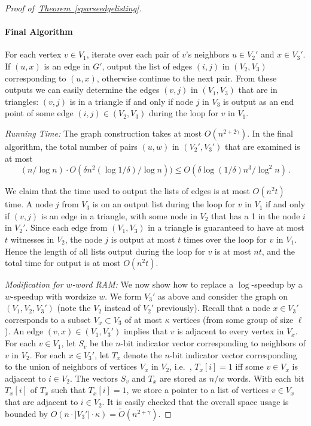 \documentclass[10pt]{article}
\theoremstyle{definition}
\providecommand{\ie}{i.e.\ }
\numberwithin{equation}{section}
\newcommand{\expref}[2]{\texorpdfstring{\hyperref[#2]{#1~\ref{#2}}}{#1~\ref{#2}}}
\begin{document}
\begin{proof}[Proof of~\expref{Theorem}{sparseedgelisting}]
\paragraph{Final Algorithm} For each vertex $v \in V_1$, iterate over each pair of $v$'s neighbors $u \in V_2'$ and $x \in V_3'$. If $(u,x)$ is an edge in $G'$, output the list of edges  $(i,j)$ in $(V_2,V_3)$ corresponding to $(u,x)$, otherwise continue to the next pair. From these outputs we can easily determine the edges $(v,j)$ in $(V_1,V_3)$
that are in triangles: $(v,j)$ is in a triangle if and only if node $j$ in $V_3$ is output as an end point of some edge $(i,j) \in (V_2,V_3)$ during the loop for $v$ in $V_1$.

\smallskip
\noindent
\emph{Running Time:} The graph construction takes at most $O(n^{2+2\gamma})$. In the final algorithm, the total number of pairs $(u,w)$ in $(V_2',V_3')$ that are examined is at most \[(n/\log n) \cdot O(\delta n^2 (\log 1/\delta)/ \log n)) \leq O(\delta \log (1/\delta) n^3/\log^2 n)\,.\]

We claim that the time used to output the lists of edges is at most $O(n^2 t)$ time. A node $j$ from $V_3$ is on an output list during the loop for $v$ in $V_1$ if and only if $(v,j)$ is an edge in a triangle, with some node in $V_2$ that has a 1 in the node $i$ in $V_2'$. Since each edge from $(V_1,V_3)$ in a triangle is guaranteed to have at most $t$ witnesses in $V_2$, the node $j$ is output at most $t$ times over the loop for $v$ in $V_1$. Hence the length of all lists output during the loop for $v$ is at most $nt$, and the total time for output is at most $O(n^2 t)$.

\smallskip
\noindent
\emph{Modification for $w$-word RAM:} We now show how to replace a $\log$-speedup by a $w$-speedup with wordsize $w$.
We form $V_3'$ as above and consider the graph on $(V_1,V_2,V_3')$ (note the $V_2$ instead of $V_2'$ previously).
Recall that a node $x \in V_3'$ corresponds to a subset $V_x \subset V_3$ of at most $\kappa$ vertices (from some group of size $\ell$).
An edge $(v,x) \in (V_1,V_3')$ implies that $v$ is adjacent to every vertex in $V_x$.
For each $v \in V_1$, let $S_v$ be the $n$-bit indicator vector corresponding to neighbors of $v$ in $V_2$. For each
$x \in V_3'$, let $T_x$ denote the $n$-bit indicator vector corresponding to the union of neighbors of vertices $V_x$ in $V_2$, \ie, $T_x[i]=1$  iff some $v \in V_x$ is adjacent to $i\in V_2$.
The vectors $S_v$ and $T_x$ are stored as $n/w$ words.  With each bit $T_x[i]$ of $T_x$ such that $T_x[i]=1$, we store a pointer to a list of vertices $v \in V_x$  that are adjacent to  $i \in V_2$. It is easily checked that the overall space usage is bounded by  $O(n \cdot |V_3'| \cdot \kappa) = \tilde{O}(n^{2+\gamma})$.


\end{proof}
\end{document}
